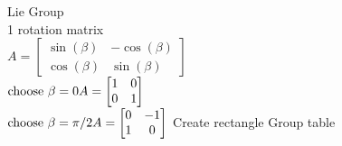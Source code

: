 \documentclass{article}
\begin{document}
Lie Group\\
1 rotation matrix\\
$
A= \begin{bmatrix}
    \sin(\beta) & -\cos(\beta)\\
    \cos(\beta) & \sin(\beta)
    \end{bmatrix}
$\\
$
\text{choose } \beta = 0\\
A= \begin{bmatrix}
    1 & 0\\
    0 & 1 
    \end{bmatrix}
$\\
$
\text{choose } \beta = \pi/2\\
A= \begin{bmatrix}
    0 & -1\\
    1 & 0 
    \end{bmatrix}
$
Create rectangle Group table\\
\end{document}
